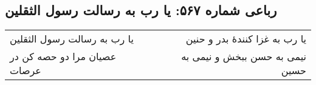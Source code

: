 \begin{center}
\section*{رباعی شماره ۵۶۷: یا رب به رسالت رسول الثقلین}
\label{sec:sh567}
\begin{longtable}{l p{0.5cm} r}
یا رب به رسالت رسول الثقلین
&&
یا رب به غزا کنندهٔ بدر و حنین
\\
عصیان مرا دو حصه کن در عرصات
&&
نیمی به حسن ببخش و نیمی به حسین
\\
\end{longtable}
\end{center}
